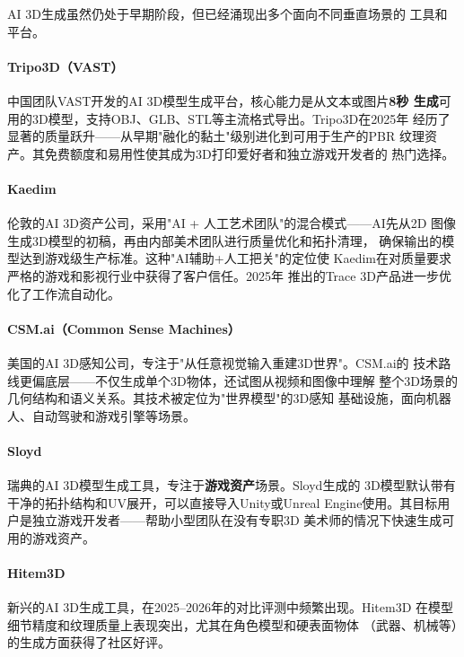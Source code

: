 AI 3D生成虽然仍处于早期阶段，但已经涌现出多个面向不同垂直场景的
工具和平台。

\paragraph{Tripo3D（VAST）}
中国团队VAST开发的AI 3D模型生成平台，核心能力是从文本或图片\textbf{8秒
生成}可用的3D模型，支持OBJ、GLB、STL等主流格式导出。Tripo3D在2025年
经历了显著的质量跃升——从早期"融化的黏土"级别进化到可用于生产的PBR
纹理资产。其免费额度和易用性使其成为3D打印爱好者和独立游戏开发者的
热门选择。

\paragraph{Kaedim}
伦敦的AI 3D资产公司，采用"AI + 人工艺术团队"的混合模式——AI先从2D
图像生成3D模型的初稿，再由内部美术团队进行质量优化和拓扑清理，
确保输出的模型达到游戏级生产标准。这种"AI辅助+人工把关"的定位使
Kaedim在对质量要求严格的游戏和影视行业中获得了客户信任。2025年
推出的Trace 3D产品进一步优化了工作流自动化。

\paragraph{CSM.ai（Common Sense Machines）}
美国的AI 3D感知公司，专注于"从任意视觉输入重建3D世界"。CSM.ai的
技术路线更偏底层——不仅生成单个3D物体，还试图从视频和图像中理解
整个3D场景的几何结构和语义关系。其技术被定位为"世界模型"的3D感知
基础设施，面向机器人、自动驾驶和游戏引擎等场景。

\paragraph{Sloyd}
瑞典的AI 3D模型生成工具，专注于\textbf{游戏资产}场景。Sloyd生成的
3D模型默认带有干净的拓扑结构和UV展开，可以直接导入Unity或Unreal
Engine使用。其目标用户是独立游戏开发者——帮助小型团队在没有专职3D
美术师的情况下快速生成可用的游戏资产。

\paragraph{Hitem3D}
新兴的AI 3D生成工具，在2025--2026年的对比评测中频繁出现。Hitem3D
在模型细节精度和纹理质量上表现突出，尤其在角色模型和硬表面物体
（武器、机械等）的生成方面获得了社区好评。




